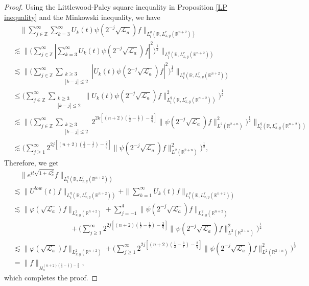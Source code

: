 \documentclass[a4paper,11pt, reqno]{amsart}
\numberwithin{equation}{section}
\theoremstyle{plain}
\theoremstyle{definition}
\theoremstyle{remark}
\begin{document}
\begin{proof}
Using the Littlewood-Paley square inequality in Proposition \ref{LP inequality} and the Minkowski inequality, we have
\begin{align*}
&\quad\|\sum_{j\in\mathbb{Z}}^\infty\sum_{k=3}^\infty U_k(t)\psi(2^{-j}\sqrt{\mathcal{L}_a})f\|_{L_t^q(\mathbb{R},L^r_{x,y}(\mathbb{R}^{n+2}))}\\
&\lesssim \|\Big(\sum_{j\in\mathbb{Z}}^\infty |\sum_{k=3}^\infty U_k(t)\psi(2^{-j}\sqrt{\mathcal{L}_a})f|^2\Big)^\frac{1}{2}\|_{L_t^q(\mathbb{R},L^r_{x,y}(\mathbb{R}^{n+2}))}\\
&\lesssim \|\Big(\sum_{j\in\mathbb{Z}}^\infty \sum_{\substack{k\geq 3\\ |k-j|\leq 2}} |U_k(t)\psi(2^{-j}\sqrt{\mathcal{L}_a})f|^2\Big)^\frac{1}{2}\|_{L_t^q(\mathbb{R},L^r_{x,y}(\mathbb{R}^{n+2}))}\\
&\leq \Big(\sum_{j\in\mathbb{Z}}^\infty \sum_{\substack{k\geq 3\\ |k-j|\leq 2}} \|U_k(t)\psi(2^{-j}\sqrt{\mathcal{L}_a})f\|_{L_t^q(\mathbb{R},L^r_{x,y}(\mathbb{R}^{n+2}))}^2\Big)^\frac{1}{2}\\
&\lesssim \|\Big(\sum_{j\in\mathbb{Z}}^\infty \sum_{\substack{k\geq 3\\ |k-j|\leq 2}} 2^{2k[(n+2)(\frac{1}{2}-\frac{1}{r})-\frac{2}{q}]}\|\psi(2^{-j}\sqrt{\mathcal{L}_a})f\|^2_{L^2(\mathbb{R}^{2+n})}\Big)^\frac{1}{2}\|_{L_t^q(\mathbb{R},L^r_{x,y}(\mathbb{R}^{n+2}))}\\
&\lesssim \Big(\sum_{j\geq1}^\infty 2^{2j[(n+2)(\frac{1}{2}-\frac{1}{r})-\frac{2}{q}]}\|\psi(2^{-j}\sqrt{\mathcal{L}_a})f\|^2_{L^2(\mathbb{R}^{2+n})}\Big)^\frac{1}{2},
\end{align*}
Therefore, we get
\begin{align*}
&\quad \|e^{it\sqrt{1+\mathcal{L}^2_a}}f\|_{L_t^q(\mathbb{R},L^r_{x,y}(\mathbb{R}^{n+2}))}\\
&\lesssim \|U^{low}(t)f\|_{L_t^q(\mathbb{R},L^r_{x,y}(\mathbb{R}^{n+2}))}+\|\sum_{k=1}^\infty U_k(t)f\|_{L_t^q(\mathbb{R},L^r_{x,y}(\mathbb{R}^{n+2}))}\\
&\lesssim\|\varphi(\sqrt{\mathcal{L}_a})f\|_{L^2_{x,y}(\mathbb{R}^{n+2})}+\sum_{j=-1}^4\|\psi(2^{-j}\sqrt{\mathcal{L}_a})f\|_{L^2_{x,y}(\mathbb{R}^{n+2})}\\
&\qquad\qquad\qquad\qquad+\Big(\sum_{j\geq1}^\infty 2^{2j[(n+2)(\frac{1}{2}-\frac{1}{r})-\frac{2}{q}]}\|\psi(2^{-j}\sqrt{\mathcal{L}_a})f\|^2_{L^2(\mathbb{R}^{2+n})}\Big)^\frac{1}{2}\\
&\lesssim\|\varphi(\sqrt{\mathcal{L}_a})f\|_{L^2_{x,y}(\mathbb{R}^{n+2})}+\Big(\sum_{j\geq1}^\infty 2^{2j[(n+2)(\frac{1}{2}-\frac{1}{r})-\frac{2}{q}]}\|\psi(2^{-j}\sqrt{\mathcal{L}_a})f\|^2_{L^2(\mathbb{R}^{2+n})}\Big)^\frac{1}{2}\\
&=\|f\|_{H_a^{(n+2)(\frac{1}{2}-\frac{1}{r})-\frac{2}{q}}},
\end{align*}
which completes the proof.
\end{proof}
\end{document}
